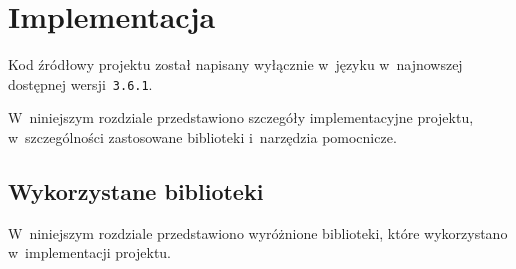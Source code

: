 \documentclass[thesis]{subfiles}
\begin{document}
\chapter{Implementacja}

Kod źródłowy projektu został napisany wyłącznie w~języku  w~najnowszej dostępnej wersji~\texttt{3.6.1}.

W~niniejszym rozdziale przedstawiono szczegóły implementacyjne projektu, w~szczególności zastosowane biblioteki i~narzędzia pomocnicze.


\section{Wykorzystane biblioteki}

W~niniejszym rozdziale przedstawiono wyróżnione biblioteki, które wykorzystano w~implementacji projektu.
\end{document}
